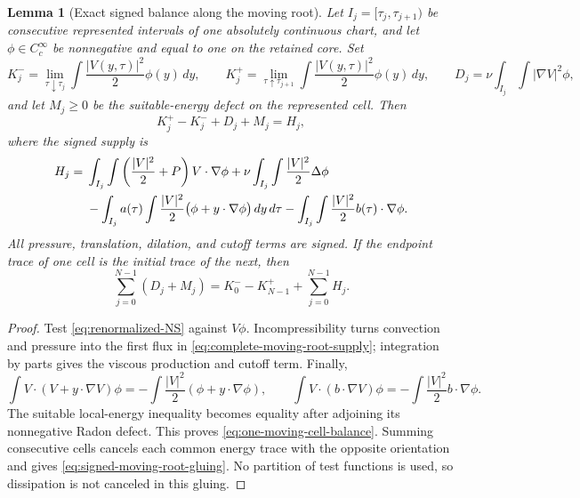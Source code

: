 \documentclass[11pt]{amsart}
\numberwithin{equation}{section}
\theoremstyle{plain}
\newtheorem{lemma}[lemma]{Lemma}
\theoremstyle{definition}
\theoremstyle{remark}
\begin{document}
\begin{lemma}[Exact signed balance along the moving root]
\label{lem:exact-signed-moving-root-balance}
Let \(I_j=[\tau_j,\tau_{j+1})\) be consecutive represented intervals of one
absolutely continuous chart, and let \(\phi\in C_c^\infty\) be nonnegative
and equal to one on the retained core.  Set
\[
 K_j^-=\lim_{\tau\downarrow\tau_j}
    \int\frac{|V(y,\tau)|^2}{2}\phi(y)\,dy,
 \qquad
 K_j^+=\lim_{\tau\uparrow\tau_{j+1}}
    \int\frac{|V(y,\tau)|^2}{2}\phi(y)\,dy,
 \qquad
 D_j=\nu\int_{I_j}\int|\nabla V|^2\phi,
\]
and let \(M_j\ge0\) be the suitable-energy defect on the represented cell.
Then
\begin{equation}\label{eq:one-moving-cell-balance}
 K_j^+-K_j^-+D_j+M_j=H_j,
\end{equation}
where the signed supply is
\begin{align}\label{eq:complete-moving-root-supply}
 H_j={}&\int_{I_j}\int
 \left(\frac{|V|^2}{2}+P\right)V\cdot\nabla\phi
 +\nu\int_{I_j}\int\frac{|V|^2}{2}\Delta\phi \notag\\
 &-\int_{I_j}a(\tau)\int\frac{|V|^2}{2}
       \bigl(\phi+y\cdot\nabla\phi\bigr)\,dy\,d\tau
 -\int_{I_j}\int\frac{|V|^2}{2}b(\tau)\cdot\nabla\phi.
\end{align}
All pressure, translation, dilation, and cutoff terms are signed.  If the
endpoint trace of one cell is the initial trace of the next, then
\begin{equation}\label{eq:signed-moving-root-gluing}
 \sum_{j=0}^{N-1}(D_j+M_j)
 =K_0^- -K_{N-1}^+ +\sum_{j=0}^{N-1}H_j .
\end{equation}
\end{lemma}

\begin{proof}
Test \eqref{eq:renormalized-NS} against \(V\phi\).  Incompressibility turns
convection and pressure into the first flux in
\eqref{eq:complete-moving-root-supply}; integration by parts gives the
viscous production and cutoff term.  Finally,
\[
 \int V\cdot(V+y\cdot\nabla V)\phi
 =-\int\frac{|V|^2}{2}(\phi+y\cdot\nabla\phi),
 \qquad
 \int V\cdot(b\cdot\nabla V)\phi
 =-\int\frac{|V|^2}{2}b\cdot\nabla\phi.
\]
The suitable local-energy inequality becomes equality after adjoining its
nonnegative Radon defect.  This proves
\eqref{eq:one-moving-cell-balance}.  Summing consecutive cells cancels each
common energy trace with the opposite orientation and gives
\eqref{eq:signed-moving-root-gluing}.  No partition of test functions is used,
so dissipation is not canceled in this gluing.
\end{proof}
\end{document}
